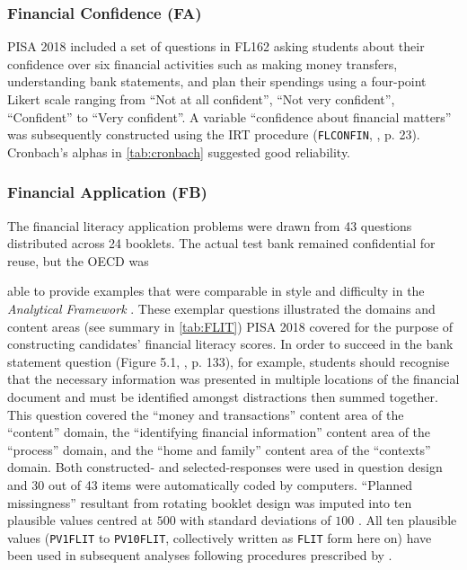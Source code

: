 \documentclass[a4paper,11pt,UKenglish,twoside,openright]{report}\usepackage[]{graphicx}\usepackage[]{color}
\begin{document}
\subsubsection{Financial Confidence (FA)}

PISA 2018 included a set of questions in \textsf{FL162} asking students about their confidence over six financial activities such as making money transfers, understanding bank statements, and plan their spendings using a four-point Likert scale ranging from ``Not at all confident'', ``Not very confident'', ``Confident'' to ``Very confident''. A variable ``confidence about financial matters'' was subsequently constructed using the IRT procedure (\texttt{FLCONFIN}, \textcite{PISAtech}, p. 23). Cronbach's alphas in \cref{tab:cronbach} suggested good reliability.

\subsubsection{Financial Application (FB)}

The financial literacy application problems were drawn from 43 questions distributed across 24 booklets. The actual test bank remained confidential for reuse, but the OECD was %

\noindent able to provide examples that were comparable in style and difficulty in the \textit{Analytical Framework} \parencite[][pp. 133--148]{PISAframework}. These exemplar questions illustrated the domains and content areas (see summary in \cref{tab:FLIT}) PISA 2018 covered for the purpose of constructing candidates' financial literacy scores. In order to succeed in the bank statement question (Figure 5.1, \textcite{PISAframework}, p. 133), for example, students should recognise that the necessary information was presented in multiple locations of the financial document and must be identified amongst distractions then summed together. This question covered the ``money and transactions'' content area of the ``content'' domain, the ``identifying financial information'' content area of the ``process'' domain, and the ``home and family'' content area of the ``contexts'' domain. Both constructed- and selected-responses were used in question design and 30 out of 43 items were automatically coded by computers. ``Planned missingness'' resultant from rotating booklet design was imputed into ten plausible values \parencite{vondavier:2014} centred at $500$ with standard deviations of $100$ \parencite{PISAframework}. All ten plausible values (\texttt{PV1FLIT} to \texttt{PV10FLIT}, collectively written as \texttt{FLIT} form here on) have been used in subsequent analyses following procedures prescribed by \textcite{rubin:1987}.
\end{document}
